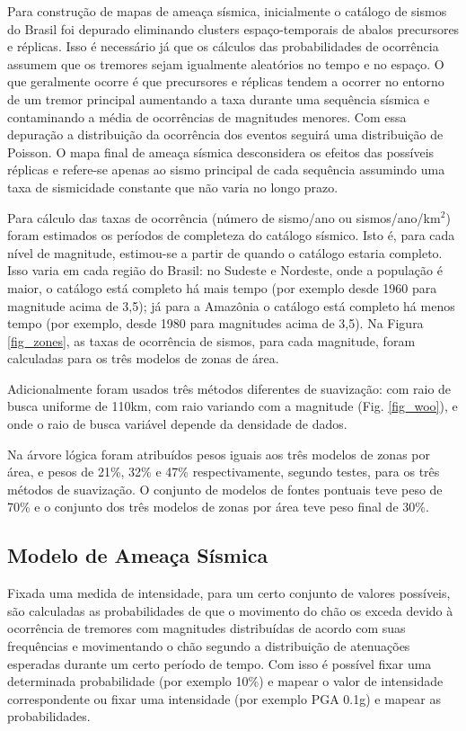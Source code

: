 \documentclass[jgrga]{agutex}
\begin{document}
\begin{article}
Para construção de mapas de ameaça sísmica, inicialmente o catálogo de sismos do Brasil foi depurado eliminando clusters espaço-temporais de abalos precursores e réplicas. Isso é necessário já que os cálculos das probabilidades de ocorrência assumem que os tremores sejam igualmente aleatórios no tempo e no espaço. O que geralmente ocorre é que precursores e réplicas tendem a ocorrer no entorno de um tremor principal aumentando a taxa durante uma sequência sísmica e contaminando a média de ocorrências de magnitudes menores. Com essa depuração a distribuição da ocorrência dos eventos seguirá uma distribuição de Poisson. O mapa final de ameaça sísmica desconsidera os efeitos das possíveis réplicas e refere-se apenas ao sismo principal de cada sequência assumindo uma taxa de sismicidade constante que não varia no longo prazo.

Para cálculo das taxas de ocorrência (número de sismo/ano ou sismos/ano/km$^2$) foram estimados os períodos de completeza do catálogo sísmico. Isto é, para cada nível de magnitude, estimou-se a partir de quando o catálogo estaria completo. Isso varia em cada região do Brasil: no Sudeste e Nordeste, onde a população é maior, o catálogo está completo há mais tempo (por exemplo desde 1960 para magnitude acima de 3,5); já para a Amazônia o catálogo está completo há menos tempo (por exemplo, desde 1980 para magnitudes acima de 3,5). Na Figura \ref{fig_zones}, as taxas de ocorrência de sismos, para cada magnitude, foram calculadas para os três modelos de zonas de área. 

Adicionalmente foram usados três métodos diferentes de suavização: \citet{frankel_1995} com raio de busca uniforme de 110km, \citet{woo_1996} com raio variando com a magnitude (Fig. \ref{fig_woo}), e \citet{helmstetter_2012} onde o raio de busca variável depende da densidade de dados. 

Na árvore lógica foram atribuídos pesos iguais aos três modelos de zonas por área, e pesos de 21\%, 32\% e 47\% respectivamente, segundo testes, para os três métodos de suavização. O conjunto de modelos de fontes pontuais teve peso de 70\% e o conjunto dos três modelos de zonas por área teve peso final de 30\%.

\subsection{Modelo de Ameaça S\'ismica}

Fixada uma medida de intensidade, para um certo conjunto de valores possíveis, são calculadas as probabilidades de que o movimento do chão os exceda devido à ocorrência de tremores com magnitudes distribuídas de acordo com suas frequências e movimentando o chão segundo a distribuição de atenuações esperadas durante um certo período de tempo. Com isso é possível fixar uma determinada probabilidade (por exemplo 10\%) e mapear o valor de intensidade correspondente ou fixar uma intensidade (por exemplo PGA 0.1g) e mapear as probabilidades.  


\end{article}
\end{document}
